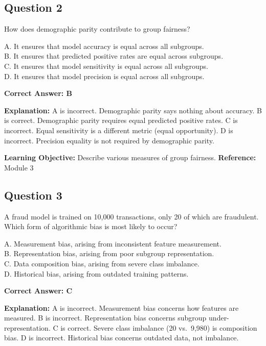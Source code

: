 \documentclass[11pt]{article}
\begin{document}
	\subsection*{Question 2}
	How does demographic parity contribute to group fairness?
	
	A. It ensures that model accuracy is equal across all subgroups.\\
	B. It ensures that predicted positive rates are equal across subgroups.\\
	C. It ensures that model sensitivity is equal across all subgroups.\\
	D. It ensures that model precision is equal across all subgroups.
	
	\vspace{0.4em}
	\textbf{Correct Answer: B}
	
	\textbf{Explanation:}
	A is incorrect. Demographic parity says nothing about accuracy.
	B is correct. Demographic parity requires equal predicted positive rates.
	C is incorrect. Equal sensitivity is a different metric (equal opportunity).
	D is incorrect. Precision equality is not required by demographic parity.
	
	\textbf{Learning Objective:} Describe various measures of group fairness.
	\textbf{Reference:} Module 3
	
	\subsection*{Question 3}
	A fraud model is trained on 10{,}000 transactions, only 20 of which are
	fraudulent. Which form of algorithmic bias is most likely to occur?
	
	A. Measurement bias, arising from inconsistent feature measurement.\\
	B. Representation bias, arising from poor subgroup representation.\\
	C. Data composition bias, arising from severe class imbalance.\\
	D. Historical bias, arising from outdated training patterns.
	
	\vspace{0.4em}
	\textbf{Correct Answer: C}
	
	\textbf{Explanation:}
	A is incorrect. Measurement bias concerns how features are measured.
	B is incorrect. Representation bias concerns subgroup under-representation.
	C is correct. Severe class imbalance (20 vs.\ 9{,}980) is composition bias.
	D is incorrect. Historical bias concerns outdated data, not imbalance.
	
\end{document}
